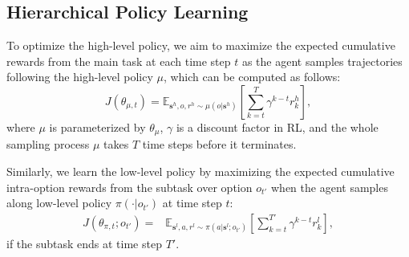 \documentclass[letterpaper]{article} %
\theoremstyle{definition}
\begin{document}


\subsection{Hierarchical Policy Learning}

To optimize the high-level policy, we aim to maximize the expected cumulative rewards from the main task at each time step $t$ as the agent samples trajectories following the high-level policy $\mu$, which can be computed as follows: 
\begin{equation}\label{return_high}
    J(\theta_{\mu,t}) = \mathbb{E}_{\mathbf{s}^h,o,r^h \sim \mu(o|\mathbf{s}^h)} [\sum_{k=t}^T \gamma^{k-t} r_k^h], %
\end{equation}
where $\mu$ is parameterized by $\theta_\mu$, $\gamma$ is a discount factor in RL, and the whole sampling process $\mu$ takes $T$ time steps before it terminates. 

Similarly, we learn the low-level policy by maximizing the expected cumulative intra-option rewards from the subtask over option $o_{t'}$ when the agent samples along low-level policy $\pi(\cdot|o_{t'})$ at time step $t$:
\begin{equation}\label{return_low}
    \begin{split}
        J(\theta_{\pi,t};o_{t'}) =& \mathbb{E}_{\mathbf{s}^l,a,r^l \sim \pi(a|\mathbf{s}^l;o_{t'})} [\sum_{k=t}^{T'} \gamma^{k-t} r_k^l ], %
    \end{split}  
\end{equation}
if the subtask ends at time step $T'$.
\end{document}
